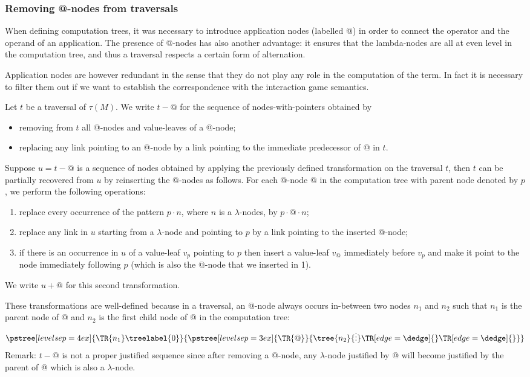 \subsubsection{Removing @-nodes from traversals}

When defining computation trees, it was necessary to introduce
application nodes (labelled @) in order to connect the operator and
the operand of an application. The presence of @-nodes has also
another advantage: it ensures that the lambda-nodes are all at even
level in the computation tree, and thus a traversal respects a certain form of
alternation.

Application nodes are however redundant in the sense that they do
not play any role in the computation of the term. In fact it is
necessary to filter them out if we want to establish the
correspondence with the interaction game semantics.

\begin{definition}
\label{dfn:appnode_filter}
Let $t$ be a traversal of $\tau(M)$.
We write $t-@$ for the sequence of nodes-with-pointers obtained by
\begin{itemize}
\item removing from $t$ all @-nodes and value-leaves of a @-node;
\item replacing any link pointing to an @-node by a link pointing to the immediate predecessor of @ in $t$.
\end{itemize}

Suppose $u = t-@$ is a sequence of nodes obtained by applying the
previously defined transformation on the traversal $t$, then $t$ can
be partially recovered from $u$ by reinserting the @-nodes as
follows. For each @-node @ in the computation tree with parent node
denoted by $p$, we perform the following operations:
\begin{enumerate}
\item replace every occurrence of the pattern $p \cdot n$, where $n$ is a $\lambda$-nodes,
by $p \cdot @ \cdot n$;
\item replace any link in $u$ starting from a $\lambda$-node and pointing to $p$ by a link pointing to the inserted @-node;
\item if there is an occurrence in $u$ of a value-leaf $v_p$ pointing to $p$ then insert a value-leaf $v_@$
immediately before $v_p$ and make it point to the node immediately
following $p$ (which is also the $@$-node that we inserted in 1).
\end{enumerate}
We write $u+@$ for this second transformation.
\end{definition}
These transformations are well-defined because in a traversal, an @-node
always occurs in-between two nodes $n_1$ and $n_2$ such that  $n_1$ is the parent node of @
and $n_2$ is the first child node of @ in the computation tree:
$$      \pstree[levelsep=4ex]{\TR{n_1}\treelabel{0} }
        {
            \pstree[levelsep=3ex]{\TR{@}}
            {
                \tree{n_2}{\vdots}
                \TR[edge=\dedge]{}
                \TR[edge=\dedge]{}
            }
        }
$$
Remark: $t-@$ is not a proper justified sequence
since after removing a @-node, any $\lambda$-node justified by @ will become
justified by the parent of @ which is also a $\lambda$-node.

